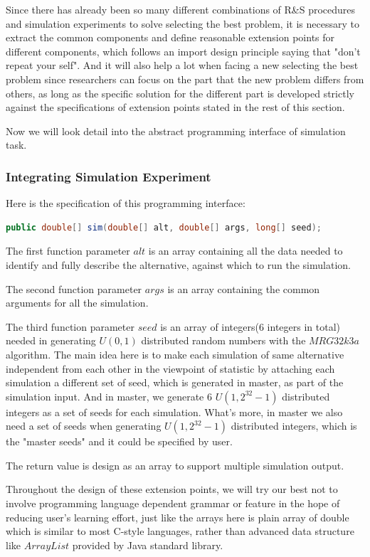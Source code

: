 Since there has already been so many different combinations of R\&S procedures and simulation experiments to solve selecting the best problem, it is necessary to extract the common components and define reasonable extension points for different components, which follows an import design principle saying that "don't repeat your self". And it will also help a lot when facing a new selecting the best problem since researchers can focus on the part that the new problem differs from others, as long as the specific solution for the different part is developed strictly against the specifications of extension points stated in the rest of this section.

Now we will look detail into the abstract programming interface of simulation task.

\subsubsection{Integrating Simulation Experiment}

Here is the specification of this programming interface:

\begin{lstlisting}[language=Java]
public double[] sim(double[] alt, double[] args, long[] seed);
\end{lstlisting}

The first function parameter $alt$ is an array containing all the data needed to identify and fully describe the alternative, against which to run the simulation.

The second function parameter $args$ is an array containing the common arguments for all the simulation.

The third function parameter $seed$ is an array of integers(6 integers in total) needed in generating $U(0,1)$ distributed random numbers with the $MRG32k3a$ algorithm. The main idea here is to make each simulation of same alternative independent from each other in the viewpoint of statistic by attaching each simulation a different set of seed, which is generated in master, as part of the simulation input. And in master, we generate 6 $U(1, 2^32 - 1)$ distributed integers as a set of seeds for each simulation. What's more, in master we also need a set of seeds when generating $U(1,2^32 - 1)$ distributed integers, which is the "master seeds" and it could be specified by user. 

The return value is design as an array to support multiple simulation output.

Throughout the design of these extension points, we will try our best not to involve programming language dependent grammar or feature in the hope of reducing user's learning effort, just like the arrays here is plain array of double which is similar to most C-style languages, rather than advanced data structure like $ArrayList$ provided by Java standard library.

